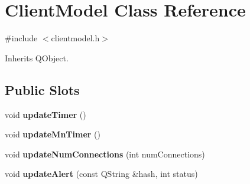 \hypertarget{class_client_model}{}\section{Client\+Model Class Reference}
\label{class_client_model}


{\ttfamily \#include $<$clientmodel.\+h$>$}



Inherits Q\+Object.

\subsection*{Public Slots}
\begin{DoxyCompactItemize}
\item 
\mbox{\label{class_client_model_a82d434ebd032c00736e043ce2d36ac5e}} 
void {\bfseries update\+Timer} ()
\item 
\mbox{\label{class_client_model_a2c343f22834086eb6e6172dbcaf6426c}} 
void {\bfseries update\+Mn\+Timer} ()
\item 
\mbox{\label{class_client_model_a75f5a1a83e65aeb8fa01140584904967}} 
void {\bfseries update\+Num\+Connections} (int num\+Connections)
\item 
\mbox{\label{class_client_model_a16758b18ded91ceba202d6023cad4b51}} 
void {\bfseries update\+Alert} (const Q\+String \&hash, int status)
\end{DoxyCompactItemize}
